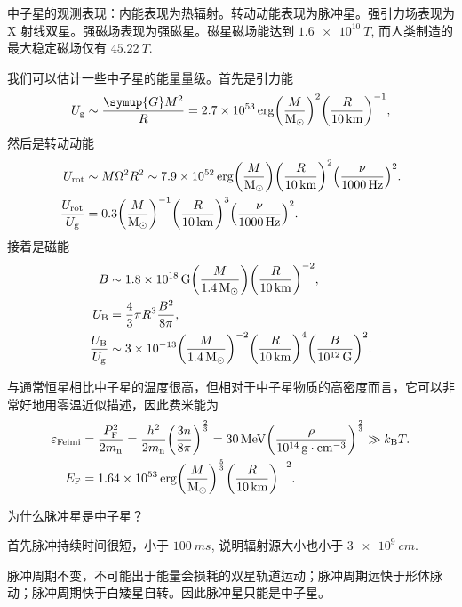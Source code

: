 \documentclass[../天体物理基础.tex]{subfiles}
\begin{document}
中子星的观测表现：内能表现为热辐射。转动动能表现为脉冲星。强引力场表现为 X 射线双星。强磁场表现为强磁星。磁星磁场能达到 $\qty{1.6e10}{T}$, 而人类制造的最大稳定磁场仅有 $\qty{45.22}{T}$.

我们可以估计一些中子星的能量量级。首先是引力能
\begin{equation}
U_{\mathrm{g}}\sim\frac{\symup{G}M^{2}}{R}=2.7\times10^{53}\,\unit{erg}\mleft(\frac{M}{\unit{M_{\odot}}}\mright)^{2}\mleft(\frac{R}{\qty{10}{km}}\mright)^{-1},
\end{equation}
然后是转动动能
\begin{align}
U_{\mathrm{rot}}&\sim M\Omega^{2}R^{2}\sim7.9\times10^{52}\,\unit{erg}\mleft(\frac{M}{\unit{M_{\odot}}}\mright)\mleft(\frac{R}{\qty{10}{km}}\mright)^{2}\mleft(\frac{\nu}{\qty{1000}{Hz}}\mright)^{2}.\\
\frac{U_{\mathrm{rot}}}{U_{\mathrm{g}}}&=0.3\mleft(\frac{M}{\unit{M_{\odot}}}\mright)^{-1}\mleft(\frac{R}{\qty{10}{km}}\mright)^{3}\mleft(\frac{\nu}{\qty{1000}{Hz}}\mright)^{2}.
\end{align}
接着是磁能
\begin{align}
B&\sim1.8\times10^{18}\,\unit{G}\mleft(\frac{M}{\qty{1.4}{M_{\odot}}}\mright)\mleft(\frac{R}{\qty{10}{km}}\mright)^{-2},\\
U_{\mathrm{B}}&=\frac{4}{3}\pi{}R^{3}\frac{B^{2}}{8\pi},\notag\\
\frac{U_{\mathrm{B}}}{U_{\mathrm{g}}}&\sim3\times10^{-13}\mleft(\frac{M}{\qty{1.4}{M_{\odot}}}\mright)^{-2}\mleft(\frac{R}{\qty{10}{km}}\mright)^{4}\mleft(\frac{B}{\qty{e12}{G}}\mright)^{2}.
\end{align}

与通常恒星相比中子星的温度很高，但相对于中子星物质的高密度而言，它可以非常好地用零温近似描述，因此费米能为
\begin{align}
\varepsilon_{\mathrm{Feimi}}&=\frac{P_{\mathrm{F}}^{2}}{2m_{\ce{n}}}=\frac{h^{2}}{2m_{\ce{n}}}\mleft(\frac{3n}{8\pi}\mright)^{\frac{2}{3}}=\qty{30}{MeV}\mleft(\frac{\rho}{\qty{e14}{g\cdot cm^{-3}}}\mright)^{\frac{2}{3}}\gg{}k_{\mathrm{B}}T.\\
E_{\mathrm{F}}&=\qty{1.64e53}{erg}\mleft(\frac{M}{\unit{M_{\odot}}}\mright)^{\frac{5}{3}}\mleft(\frac{R}{\qty{10}{km}}\mright)^{-2}.
\end{align}

为什么脉冲星是中子星？

首先脉冲持续时间很短，小于 $\qty{100}{ms}$, 说明辐射源大小也小于 $\qty{3e9}{cm}$.

脉冲周期不变，不可能出于能量会损耗的双星轨道运动；脉冲周期远快于形体脉动；脉冲周期快于白矮星自转。因此脉冲星只能是中子星。
\end{document}
